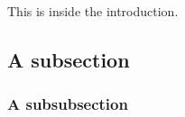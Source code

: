 \documentclass[../master.tex]{subfiles}
\begin{document}
This is inside the introduction.

\subsection{A subsection}

\subsubsection{A subsubsection}
\end{document}

